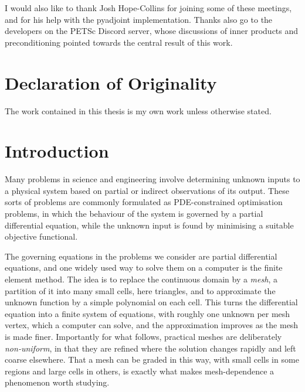 \documentclass[a4paper,11pt]{article}
\theoremstyle{spacedplain} \newtheorem{theorem}[counter]{Theorem} \newtheorem{lemma}[counter]{Lemma} \newtheorem{prop}[counter]{Proposition} \newtheorem{cor}[counter]{Corollary}
\theoremstyle{spaceddefinition} \newtheorem{defn}[counter]{Definition} \newtheorem{example}[counter]{Example} \newtheorem{remark}[counter]{Remark}
\begin{document}
I would also like to thank Josh Hope-Collins for joining some of these meetings, and for his help with the pyadjoint implementation. Thanks also go to the developers on the PETSc Discord server, whose discussions of inner products and preconditioning pointed towards the central result of this work.

\section*{Declaration of Originality}

The work contained in this thesis is my own work unless otherwise stated.

\newpage
\tableofcontents
\newpage


\section{Introduction}
\label{sec:intro}

Many problems in science and engineering involve determining unknown inputs to a physical system based on partial or indirect observations of its output. These sorts of problems are commonly formulated as PDE-constrained optimisation problems, in which the behaviour of the system is governed by a partial differential equation, while the unknown input is found by minimising a suitable objective functional.

The governing equations in the problems we consider are partial differential equations, and one widely used way to solve them on a computer is the finite element method. The idea is to replace the continuous domain by a \emph{mesh}, a partition of it into many small cells, here triangles, and to approximate the unknown function by a simple polynomial on each cell. This turns the differential equation into a finite system of equations, with roughly one unknown per mesh vertex, which a computer can solve, and the approximation improves as the mesh is made finer. Importantly for what follows, practical meshes are deliberately \emph{non-uniform}, in that they are refined where the solution changes rapidly and left coarse elsewhere. That a mesh can be graded in this way, with small cells in some regions and large cells in others, is exactly what makes mesh-dependence a phenomenon worth studying.
\end{document}
